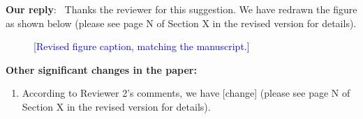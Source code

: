 \documentclass[letter,onecolumn,11pt]{IEEEtran}
\begin{document}
\begin{enumerate}[1)]
\vspace{2ex} \textbf{Our reply}: \ Thanks the reviewer for this suggestion. We have redrawn the figure as shown below (please see page N of Section X in the revised version for details).

\setcounter{figure}{0}  %
\begin{figure}[H]       %
\centering
\fbox{\rule{0pt}{3cm}\rule{0.55\columnwidth}{0pt}} %
\caption{\textcolor{blue}{[Revised figure caption, matching the manuscript.]}}
\end{figure}

\vspace{2ex} \textbf{Other significant changes in the paper:}
\vspace{2ex}
\begin{enumerate}[$\bullet$]
\item According to Reviewer 2's comments, we have [change] (please see page N of Section X in the revised version for details).
\end{enumerate}
\end{enumerate}

\vfill\newpage
\end{document}

